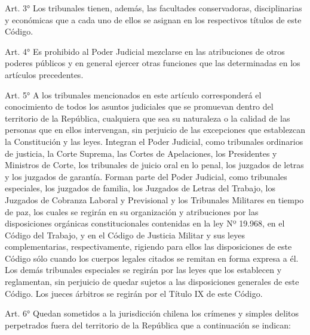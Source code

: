     Art. 3° Los tribunales tienen, además, las facultades conservadoras, disciplinarias y económicas que a cada uno de ellos se asignan en los respectivos títulos de este Código.


    Art. 4° Es prohibido al Poder Judicial mezclarse en las atribuciones de otros poderes públicos y en general ejercer otras funciones que las determinadas en los artículos precedentes.

    Art. 5° A los tribunales mencionados en este artículo corresponderá el conocimiento de todos los asuntos judiciales que se promuevan dentro del territorio de la República, cualquiera que sea su naturaleza o la calidad de las personas que en ellos intervengan, sin perjuicio de las excepciones que establezcan la Constitución y las leyes.
    Integran el Poder Judicial, como tribunales ordinarios de justicia, la Corte Suprema, las Cortes de Apelaciones, los Presidentes y Ministros de Corte, los tribunales de juicio oral en lo penal, los juzgados de letras y los juzgados de garantía.
    Forman parte del Poder Judicial, como tribunales especiales, los juzgados de familia, los Juzgados de Letras del Trabajo, los Juzgados de Cobranza Laboral y Previsional y los Tribunales Militares en tiempo de paz, los cuales se regirán en su organización y atribuciones por las disposiciones orgánicas constitucionales contenidas en la ley Nº 19.968, en el Código del Trabajo, y en el Código de Justicia Militar y sus leyes complementarias, respectivamente, rigiendo para ellos las disposiciones de este Código sólo cuando los cuerpos legales citados se remitan en forma expresa a él.
    Los demás tribunales especiales se regirán por las leyes que los establecen y reglamentan, sin perjuicio de quedar sujetos a las disposiciones generales de este Código.
    Los jueces árbitros se regirán por el Título IX de este Código.



    Art. 6° Quedan sometidos a la jurisdicción chilena los crímenes y simples delitos perpetrados fuera del territorio de la República que a continuación se indican:

